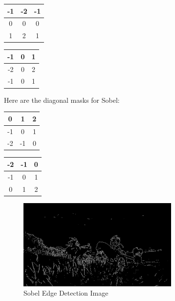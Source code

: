 \documentclass[conference]{IEEEtran}
\begin{document}
\begin{center}
\begin{tabular}{ |c|c|c| } 
\hline
-1 & -2 & -1 \\ \hline
0 & 0 & 0 \\ \hline
1 & 2 & 1 \\ \hline
\end{tabular}
\end{center}

\begin{center}
\begin{tabular}{ |c|c|c| } 
\hline
-1 & 0 & 1 \\ \hline
-2 & 0 & 2 \\ \hline
-1 & 0 & 1 \\ \hline
\end{tabular}
\end{center}

Here are the diagonal masks for Sobel:

\begin{center}
\begin{tabular}{ |c|c|c| } 
\hline
0 & 1 & 2 \\ \hline
-1 & 0 & 1 \\ \hline
-2 & -1 & 0 \\ \hline
\end{tabular}
\end{center}

\begin{center}
\begin{tabular}{ |c|c|c| } 
\hline
-2 & -1 & 0 \\ \hline
-1 & 0 & 1 \\ \hline
0 & 1 & 2 \\ \hline
\end{tabular}
\end{center}

\begin{figure}[htbp]
    \centering
    \includegraphics[width=8cm, height=4.5cm]{images/eldenring_sobel.jpg}
    \caption{Sobel Edge Detection Image}
\end{figure}
\end{document}
